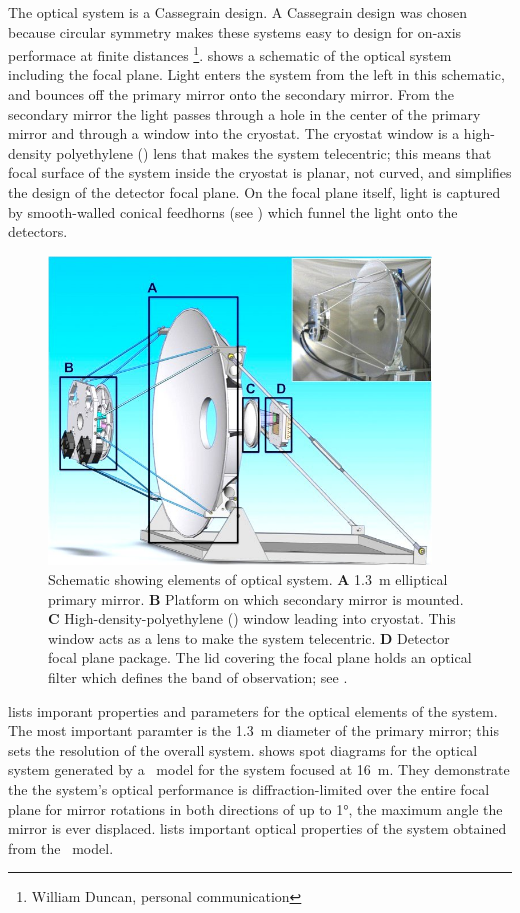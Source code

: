 The optical system is a Cassegrain design.
A Cassegrain design was chosen because circular symmetry makes these systems easy to design for on-axis performace at finite distances%
\footnote{William Duncan, personal communication}.
 shows a schematic of the optical system including the focal plane.
Light enters the system from the left in this schematic, and bounces off the primary mirror onto the secondary mirror.
From the secondary mirror the light passes through a hole in the center of the primary mirror and through a window into the cryostat.
The cryostat window is a high-density polyethylene (\HDPE) lens that makes the system telecentric; this means that focal surface of the system inside the cryostat is planar, not curved, and simplifies the design of the detector focal plane.
On the focal plane itself, light is captured by smooth-walled conical feedhorns (see ) which funnel the light onto the detectors.

\begin{figure}
\centering
\includegraphics[width=4in]{images/optics-labeled-fixed.jpg}
\caption{
Schematic showing elements of optical system.
\textbf{A} \SI{1.3}{\m} elliptical primary mirror.
\textbf{B} Platform on which secondary mirror is mounted.
\textbf{C} High-density-polyethylene (\HDPE) window leading into cryostat.
           This window acts as a lens to make the system telecentric.
\textbf{D} Detector focal plane package.
           The lid covering the focal plane holds an optical filter which defines the band of observation; see .
}
\label{fig:ch4-optical-schematic}
\end{figure}

 lists imporant properties and parameters for the optical elements of the system.
The most important paramter is the \SI{1.3}{\m} diameter of the primary mirror; this sets the resolution of the overall system.
 shows spot diagrams for the optical system generated by a \ZEMAX\ model for the system focused at \SI{16}{\m}.
They demonstrate the the system's optical performance is diffraction-limited over the entire focal plane for mirror rotations in both directions of up to \ang{1}, the maximum angle the mirror is ever displaced.
 lists important optical properties of the system obtained from the \ZEMAX\ model.


